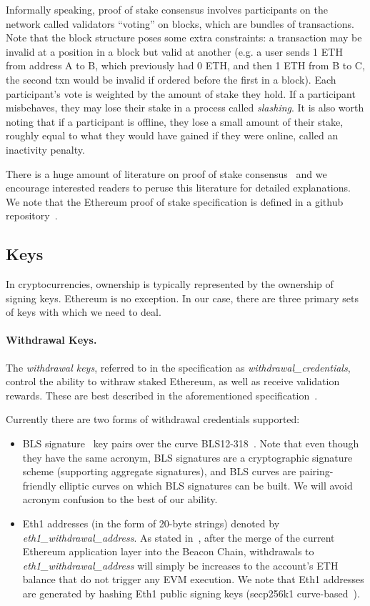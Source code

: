 Informally speaking, proof of stake consensus involves participants on the network called validators ``voting'' on blocks, which are bundles of transactions. Note that the block structure poses some extra constraints:  a transaction may be invalid at a position in a block but valid at another (e.g. a user sends 1 ETH from address A to B, which previously had 0 ETH, and then 1 ETH from B to C, the second txn would be invalid if ordered before the first in a block).   Each participant's vote is weighted by the amount of stake they hold.  If a participant misbehaves, they may lose their stake in a process called \emph{slashing}.  It is also worth noting that if a participant is offline, they lose a small amount of their stake, roughly equal to what they would have gained if they were online, called an inactivity penalty. 

There is a huge amount of literature on proof of stake consensus~\cite{buterin2017casper,C:KRDO17,FC:DaiPasShi19} and we encourage interested readers to peruse this literature for detailed explanations.  We note that the Ethereum proof of stake specification is defined in a github repository~\cite{EthVal}.

\subsection{Keys}
In cryptocurrencies, ownership is typically represented by the ownership of signing keys.  Ethereum is no exception.  In our case, there are three primary sets of keys with which we need to deal.

\paragraph{Withdrawal Keys.}  The \emph{withdrawal keys}, referred to in the specification as \emph{withdrawal\_credentials}, control the ability to withraw staked Ethereum, as well as receive validation rewards.  These are best described in the aforementioned specification~\cite{EthVal}.

Currently there are two forms of withdrawal credentials supported:
\begin{itemize}
\item BLS signature~\cite{AC:BonLynSha01} key pairs over the curve BLS12-318~\cite{barreto2002constructing,BLS12-318}.  Note that even though they have the same acronym, BLS signatures are a cryptographic signature scheme (supporting aggregate signatures), and BLS curves are pairing-friendly elliptic curves on which BLS signatures can be built.  We will avoid acronym confusion to the best of our ability.
\item Eth1 addresses (in the form of 20-byte strings) denoted by \emph{eth1\_withdrawal\_address}.  As stated in~\cite{EthVal}, after the merge of the current Ethereum application layer into the Beacon Chain, withdrawals to \emph{eth1\_withdrawal\_address} will simply be increases to the account's ETH balance that do not trigger any EVM execution.  We note that Eth1 addresses are generated by hashing Eth1 public signing keys (secp256k1 curve-based~\cite{secp256k1}).
\end{itemize}

